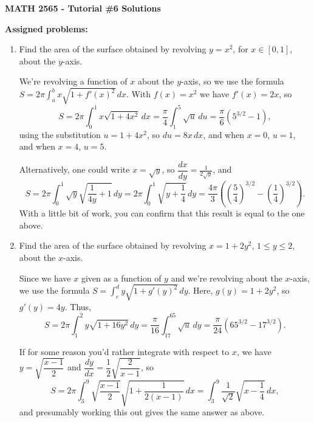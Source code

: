 \documentclass[12pt]{article}
\begin{document}
\author{Instructor: Sean Fitzpatrick}
\thispagestyle{empty}
\begin{center}
{\bf MATH 2565 - Tutorial \#6 Solutions}
\end{center}

\textbf{Assigned problems:}

 \begin{enumerate}



 
 \item Find the area of the surface obtained by revolving $y=x^2$, for $x\in [0,1]$, about the $y$-axis.
 
\medskip

We're revolving a function of $x$ about the $y$-axis, so we use the formula $S=2\pi\int_a^b x\sqrt{1+f'(x)^2}\,dx$. With $f(x)=x^2$ we have $f'(x)=2x$, so
\[
 S = 2\pi\int_0^1 x\sqrt{1+4x^2}\,dx = \frac{\pi}{4}\int_1^5 \sqrt{u}\,du = \frac{\pi}{6}(5^{3/2}-1),
\]
using the substitution $u=1+4x^2$, so $du=8x\,dx$, and when $x=0$, $u=1$, and when $x=4$, $u=5$.

\bigskip

Alternatively, one could write $x=\sqrt{y}$, so $\dfrac{dx}{dy}=\frac{1}{2\sqrt{y}}$, and
\[
S = 2\pi\int_0^1\sqrt{y}\sqrt{\frac{1}{4y}+1}\,dy = 2\pi \int_0^1\sqrt{y+\frac{1}{4}}\,dy = \frac{4\pi}{3}\left(\left(\frac{5}{4}\right)^{3/2}-\left(\frac{1}{4}\right)^{3/2}\right).
\]
With a little bit of work, you can confirm that this result is equal to the one above.

\bigskip

 
 \item Find the area of the surface obtained by revolving $x=1+2y^2$, $1\leq y\leq 2$, about the $x$-axis.

\medskip


Since we have $x$ given as a function of $y$ and we're revolving about the $x$-axis, we use the formula $S=\int_c^d y\sqrt{1+g'(y)^2}\,dy$. Here, $g(y) = 1+2y^2$, so $g'(y) = 4y$. Thus,
\[
 S = 2\pi\int_1^2 y\sqrt{1+16y^2}\,dy = \frac{\pi}{16}\int_{17}^{65}\sqrt{u}\,dy = \frac{\pi}{24}(65^{3/2}-17^{3/2}).
\]

 \bigskip
 
 If for some reason you'd rather integrate with respect to $x$, we have $y=\sqrt{\dfrac{x-1}{2}}$ and $\dfrac{dy}{dx}=\dfrac{1}{2}\sqrt{\dfrac{2}{x-1}}$, so
 \[
 S = 2\pi\int_3^9\sqrt{\frac{x-1}{2}}\sqrt{1+\frac{1}{2(x-1)}}\,dx = \int_3^9 \frac{1}{\sqrt{2}}\sqrt{x-\frac{1}{4}}\,dx ,
 \]
 and presumably working this out gives the same answer as above.
 
\end{enumerate}
\end{document}
